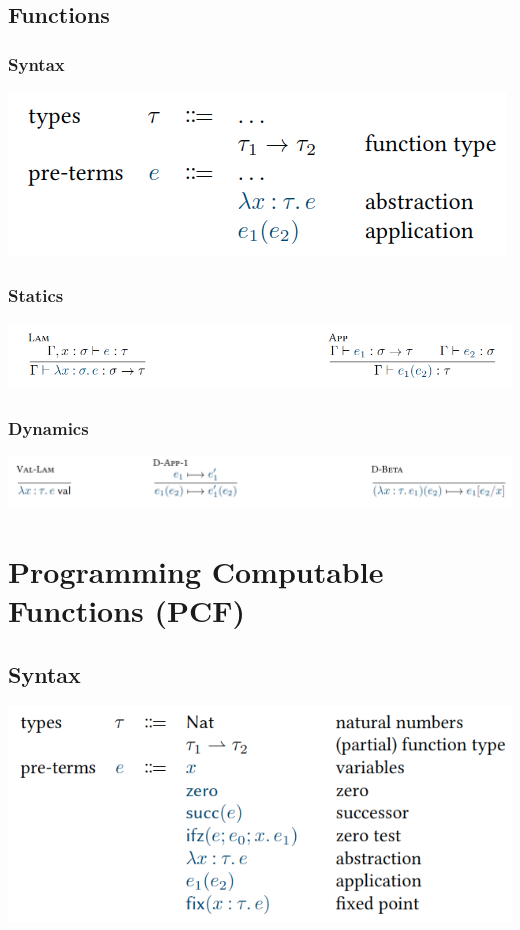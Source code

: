 \documentclass[11pt,a4paper,titlepage,dvipsnames,cmyk]{scrartcl}
\begin{document}
\subsection{Functions}
\subsubsection{Syntax}
\begin{center}
\includegraphics[width=\textwidth/2]{pics/syntax-stlc-func.png}
\end{center}
\subsubsection{Statics}
\includegraphics[width=\textwidth]{pics/static-stlc-func.png}
\subsubsection{Dynamics}
\includegraphics[width=\textwidth]{pics/dynamic-stlc-func.png}

\newpage
\section{Programming Computable Functions (PCF)}
\subsection{Syntax}
\begin{center}
\includegraphics[width=\textwidth/2]{pics/syntax-pcf.png}
\end{center}
\end{document}
